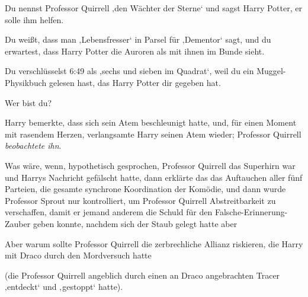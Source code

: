 Du nennst Professor Quirrell ‚den Wächter der Sterne‘ und sagst Harry Potter, er solle ihm helfen.

Du weißt, dass man ‚Lebensfresser‘ in Parsel für ‚Dementor‘ sagt, und du erwartest, dass Harry Potter die Auroren als mit ihnen im Bunde sieht.

Du verschlüsselst 6:49 als ‚sechs und sieben im Quadrat‘, weil du ein Muggel-Physikbuch gelesen hast, das Harry Potter dir gegeben hat.

Wer bist du?

Harry bemerkte, dass sich sein Atem beschleunigt hatte, und, für einen Moment mit rasendem Herzen, verlangsamte Harry seinen Atem wieder; Professor Quirrell \emph{beobachtete ihn}.

Was wäre, wenn, hypothetisch gesprochen, Professor Quirrell das Superhirn war und Harrys Nachricht gefälscht hatte, dann erklärte das das Auftauchen aller fünf Parteien, die gesamte synchrone Koordination der Komödie, und dann wurde Professor Sprout nur kontrolliert, um Professor Quirrell Abstreitbarkeit zu verschaffen, damit er jemand anderem die Schuld für den Falsche-Erinnerung-Zauber geben konnte, nachdem sich der Staub gelegt hatte aber

Aber warum sollte Professor Quirrell die zerbrechliche Allianz riskieren, die Harry mit Draco durch den Mordversuch hatte

(die Professor Quirrell angeblich durch einen an Draco angebrachten Tracer ‚entdeckt‘ und ‚gestoppt‘ hatte).

